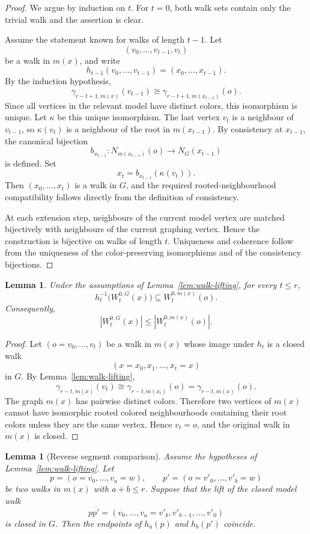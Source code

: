 \documentclass[11pt]{amsart}
\newtheorem{lemma}[theorem]{Lemma}
\theoremstyle{remark}
\begin{document}
\begin{proof}
We argue by induction on $t$.  For $t=0$, both walk sets contain only the trivial walk and the assertion is clear.

Assume the statement known for walks of length $t-1$.  Let
\[
 (v_0,\ldots,v_{t-1},v_t)
\]
be a walk in $m(x)$, and write
\[
 h_{t-1}(v_0,\ldots,v_{t-1})=(x_0,\ldots,x_{t-1}).
\]
By the induction hypothesis,
\[
 \gamma_{r-t+1,m(x)}(v_{t-1})\cong \gamma_{r-t+1,m(x_{t-1})}(o).
\]
Since all vertices in the relevant model have distinct colors, this isomorphism is unique.  Let $\kappa$ be this unique isomorphism.  The last vertex $v_t$ is a neighbour of $v_{t-1}$, so $\kappa(v_t)$ is a neighbour of the root in $m(x_{t-1})$.  By consistency at $x_{t-1}$, the canonical bijection
\[
 b_{x_{t-1}}\colon N_{m(x_{t-1})}(o)\to N_G(x_{t-1})
\]
is defined.  Set
\[
 x_t=b_{x_{t-1}}(\kappa(v_t)).
\]
Then $(x_0,\ldots,x_t)$ is a walk in $G$, and the required rooted-neighbourhood compatibility follows directly from the definition of consistency.

At each extension step, neighbours of the current model vertex are matched bijectively with neighbours of the current graphing vertex.  Hence the construction is bijective on walks of length $t$.  Uniqueness and coherence follow from the uniqueness of the color-preserving isomorphisms and of the consistency bijections.
\end{proof}

\begin{lemma}\label{lem:closed-walk-inequality}
Under the assumptions of Lemma~\ref{lem:walk-lifting}, for every $t\leq r$,
\[
 h_t^{-1}\bigl(W_t^{0,G}(x)\bigr)\subseteq W_t^{0,m(x)}(o).
\]
Consequently,
\[
 |W_t^{0,G}(x)|\leq |W_t^{0,m(x)}(o)|.
\]
\end{lemma}

\begin{proof}
Let $(o=v_0,\ldots,v_t)$ be a walk in $m(x)$ whose image under $h_t$ is a closed walk
\[
 (x=x_0,x_1,\ldots,x_t=x)
\]
in $G$.  By Lemma~\ref{lem:walk-lifting},
\[
 \gamma_{r-t,m(x)}(v_t)\cong \gamma_{r-t,m(x_t)}(o)=\gamma_{r-t,m(x)}(o).
\]
The graph $m(x)$ has pairwise distinct colors.  Therefore two vertices of $m(x)$ cannot have isomorphic rooted colored neighbourhoods containing their root colors unless they are the same vertex.  Hence $v_t=o$, and the original walk in $m(x)$ is closed.
\end{proof}

\begin{lemma}[Reverse segment comparison]\label{lem:reverse-segment}
Assume the hypotheses of Lemma~\ref{lem:walk-lifting}.  Let
\[
 p=(o=v_0,\ldots,v_a=w),\qquad
 p'=(o=v'_0,\ldots,v'_b=w)
\]
be two walks in $m(x)$ with $a+b\leq r$.  Suppose that the lift of the closed model walk
\[
 p\overline{p'}=(v_0,\ldots,v_a=v'_b,v'_{b-1},\ldots,v'_0)
\]
is closed in $G$.  Then the endpoints of $h_a(p)$ and $h_b(p')$ coincide.
\end{lemma}
\end{document}

